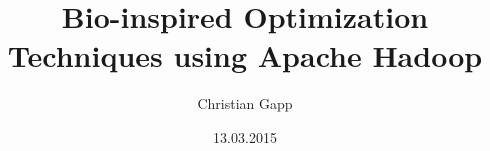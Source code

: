 \title
{Bio-inspired Optimization Techniques using Apache Hadoop}
\author{Christian Gapp}
\date[KPT 2004] %
{13.03.2015}